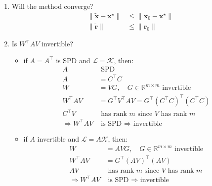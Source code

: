 \begin{enumerate}
    \item Will the method converge?
          \begin{align*}
              \|\widetilde{\mathbf{x}} - \mathbf{x}^\star\| & \leq \|\mathbf{x}_0 - \mathbf{x}^\star\| \\
              \|\widetilde{\mathbf{r}}\|           & \leq \|\mathbf{r}_0\|
          \end{align*}
    \item Is $W^{\top} A V$ invertible?
          \begin{itemize}
              \item if $A = A^{\top}$ is SPD and $\mathcal{L} = \mathcal{K}$, then:
                    \begin{align*}
                        A                   & \text{ SPD}                                                 \\
                        A                   & = C^{\top} C                                                     \\
                        W                   & = VG, \quad G \in  \mathbb{R}^{m \times m} \text{ invertible} \\
                        W^{\top} A V             & = G^{\top} V^{\top} A V = G^{\top} (C^{\top} C)^{\top}(C^{\top} C)                        \\
                        C^{\top} V               & \text{ has rank } m \text{ since } V \text{ has rank } m    \\
                        \Rightarrow W^{\top} A V & \text{ is SPD } \Rightarrow \text{ invertible}
                    \end{align*}
              \item if $A$ invertible and $\mathcal{L} = A\mathcal{K}$, then:
                    \begin{align*}
                        W                   & = A V G, \quad G  \in  \mathbb{R}^{m \times m} \text{ invertible} \\
                        W^{\top} A V             & = G^{\top} (A V)^{\top} (A V)                                             \\
                        A V                 & \text{ has rank } m \text{ since } V \text{ has rank } m        \\
                        \Rightarrow W^{\top} A V & \text{ is SPD } \Rightarrow \text{ invertible}
                    \end{align*}
          \end{itemize}
\end{enumerate}
